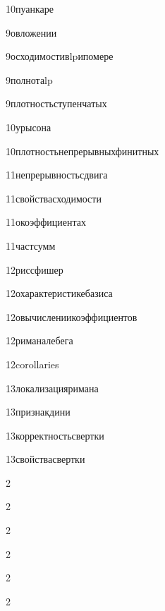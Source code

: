 {10}{пуанкаре}

{9}{овложении}

{9}{осходимостивlpипомере}

{9}{полнотаlp}

{9}{плотностьступенчатых}

{10}{урысона}

{10}{плотностьнепрерывныхфинитных}

{11}{непрерывностьсдвига}

{11}{свойствасходимости}

{11}{окоэффициентах}

{11}{частсумм}

{12}{риссфишер}

{12}{охарактеристикебазиса}

{12}{овычислениикоэффициентов}

{12}{риманалебега}

{12}{corollaries}

{13}{локализацияримана}

{13}{признакдини}

{13}{корректностьсвертки}

{13}{свойствасвертки}

{2}{}

{2}{}

{2}{}

{2}{}

{2}{}

{2}{}


